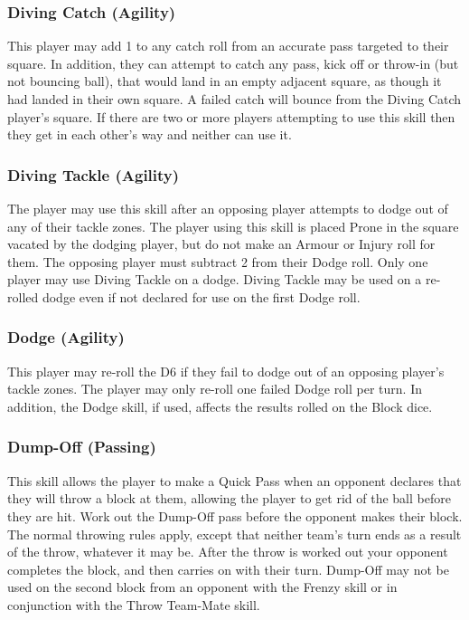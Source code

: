 \begin{multicols}{3}
\subsubsection{Diving Catch (Agility)}
\par This player may add 1 to any catch roll from an accurate pass targeted to their square. In addition, they can attempt to catch any pass, kick off or throw-in (but not bouncing ball), that would land in an empty adjacent square, as though it had landed in their own square. A failed catch will bounce from the Diving Catch player's square. If there are two or more players attempting to use this skill then they get in each other's way and neither can use it.

\subsubsection{Diving Tackle (Agility)}
\par The player may use this skill after an opposing player attempts to dodge out of any of their tackle zones. The player using this skill is placed Prone in the square vacated by the dodging player, but do not make an Armour or Injury roll for them. The opposing player must subtract 2 from their Dodge roll. Only one player may use Diving Tackle on a dodge. Diving Tackle may be used on a re-rolled dodge even if not declared for use on the first Dodge roll.

\subsubsection{Dodge (Agility)}
\par This player may re-roll the D6 if they fail to dodge out of an opposing player's tackle zones. The player may only re-roll one failed Dodge roll per turn. In addition, the Dodge skill, if used, affects the results rolled on the Block dice.

\subsubsection{Dump-Off (Passing)}
\par This skill allows the player to make a Quick Pass when an opponent declares that they will throw a block at them, allowing the player to get rid of the ball before they are hit. Work out the Dump-Off pass before the opponent makes their block. The normal throwing rules apply, except that neither team's turn ends as a result of the throw, whatever it may be. After the throw is worked out your opponent completes the block, and then carries on with their turn. Dump-Off may not be used on the second block from an opponent with the Frenzy skill or in conjunction with the Throw Team-Mate skill.


\end{multicols}
